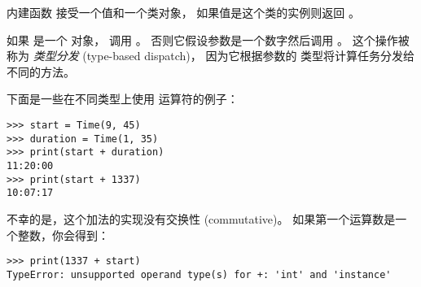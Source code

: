 %

内建函数  接受一个值和一个类对象，
如果值是这个类的实例则返回  。
  


如果  是一个  对象， 调用  。
否则它假设参数是一个数字然后调用  。
这个操作被称为 {\em 类型分发} (type-based dispatch)， 因为它根据参数的
类型将计算任务分发给不同的方法。

  


下面是一些在不同类型上使用 \li{+} 运算符的例子：

\begin{lstlisting}
>>> start = Time(9, 45)
>>> duration = Time(1, 35)
>>> print(start + duration)
11:20:00
>>> print(start + 1337)
10:07:17
\end{lstlisting}

%

不幸的是，这个加法的实现没有交换性 (commutative)。
如果第一个运算数是一个整数，你会得到：


\begin{lstlisting}
>>> print(1337 + start)
TypeError: unsupported operand type(s) for +: 'int' and 'instance'
\end{lstlisting}

%

